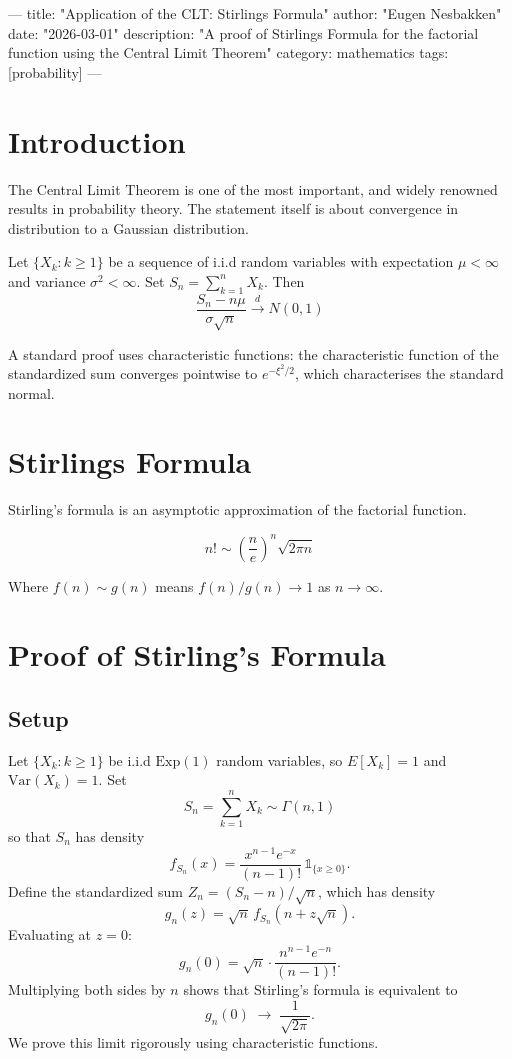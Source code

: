 ---
title: "Application of the CLT: Stirlings Formula"
author: "Eugen Nesbakken"
date: "2026-03-01"
description: "A proof of Stirlings Formula for the factorial function using the Central Limit Theorem"
category: mathematics
tags: [probability]
---

\section{Introduction}

The Central Limit Theorem is one of the most important, and widely renowned results in probability theory. The statement
itself is about convergence in distribution to a Gaussian distribution.

\begin{theorem}
  Let $\{X_k : k \ge 1\}$ be a sequence of i.i.d random variables with expectation $\mu < \infty$ and variance $\sigma^2 < \infty$.
  Set $S_n = \sum_{k=1}^{n} X_k$. Then
  $$
  \frac{S_n - n\mu}{\sigma\sqrt{n}} \xrightarrow{d} N(0,1)
  $$
\end{theorem}

A standard proof uses characteristic functions: the characteristic function of the standardized sum converges pointwise to $e^{-\xi^2/2}$, which characterises the standard normal.

\section{Stirlings Formula}

Stirling's formula is an asymptotic approximation of the factorial function.

\begin{theorem}
  $$n! \sim \left(\frac{n}{e}\right)^n \sqrt{2\pi n}$$
\end{theorem}

Where $f(n) \sim g(n)$ means $f(n)/g(n) \to 1$ as $n \to \infty$.

\section{Proof of Stirling's Formula}

\subsection{Setup}

Let $\{X_k : k \ge 1\}$ be i.i.d $\mathrm{Exp}(1)$ random variables, so $E[X_k] = 1$ and $\mathrm{Var}(X_k) = 1$. Set
$$
S_n = \sum_{k=1}^n X_k \sim \Gamma(n, 1)
$$
so that $S_n$ has density
$$
f_{S_n}(x) = \frac{x^{n-1} e^{-x}}{(n-1)!}\,\mathbb{1}_{\{x \ge 0\}}.
$$
Define the standardized sum $Z_n = (S_n - n)/\sqrt{n}$, which has density
$$
g_n(z) = \sqrt{n}\, f_{S_n}(n + z\sqrt{n}).
$$
Evaluating at $z = 0$:
$$
g_n(0) = \sqrt{n}\cdot\frac{n^{n-1}e^{-n}}{(n-1)!}.
$$
Multiplying both sides by $n$ shows that Stirling's formula is equivalent to
$$
g_n(0) \;\to\; \frac{1}{\sqrt{2\pi}}.
$$
We prove this limit rigorously using characteristic functions.

